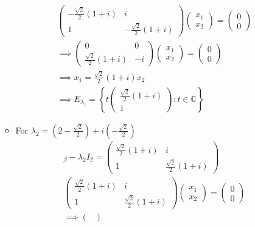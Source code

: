 \begin{enumerate}
\begin{itemize}
\begin{gather}
\begin{pmatrix}
-\frac{\sqrt{2}}{2}(1+i) & i\\
1 & -\frac{\sqrt{2}}{2}(1+i)
\end{pmatrix}
\begin{pmatrix}
x_1\\x_2
\end{pmatrix}
=
\begin{pmatrix}
0\\
0
\end{pmatrix}\\
\implies
\begin{pmatrix}
0 & 0\\
\frac{\sqrt{2}}{2}(1+i) & -i
\end{pmatrix}
\begin{pmatrix}
x_1\\x_2
\end{pmatrix}
=
\begin{pmatrix}
0\\
0
\end{pmatrix}\\
\implies x_1 = \frac{\sqrt{2}}{2}(1+i)x_2\\
\implies E_{\lambda_1} =
\left\{t\begin{pmatrix}\frac{\sqrt{2}}{2}(1+i)\\1\end{pmatrix} \colon
  t \in \mathbb{C}\right\}
\end{gather}
\item For $\lambda_2 =  \left(2 - \frac{\sqrt{2}}{2}\right) +
i\left(-\frac{\sqrt{2}}{2}\right)$
\begin{gather}
[\mathsf{T}]_\beta -\lambda_2I_2 = \begin{pmatrix}
\frac{\sqrt{2}}{2}(1+i) & i\\
1 & \frac{\sqrt{2}}{2}(1+i)
\end{pmatrix}\\
\begin{pmatrix}
\frac{\sqrt{2}}{2}(1+i) & i\\
1 & \frac{\sqrt{2}}{2}(1+i)
\end{pmatrix}
\begin{pmatrix}
x_1\\x_2
\end{pmatrix}
=
\begin{pmatrix}
0\\
0
\end{pmatrix}\\
\implies
\begin{pmatrix}

\end{pmatrix}
\end{gather}
\end{itemize}
\end{enumerate}
